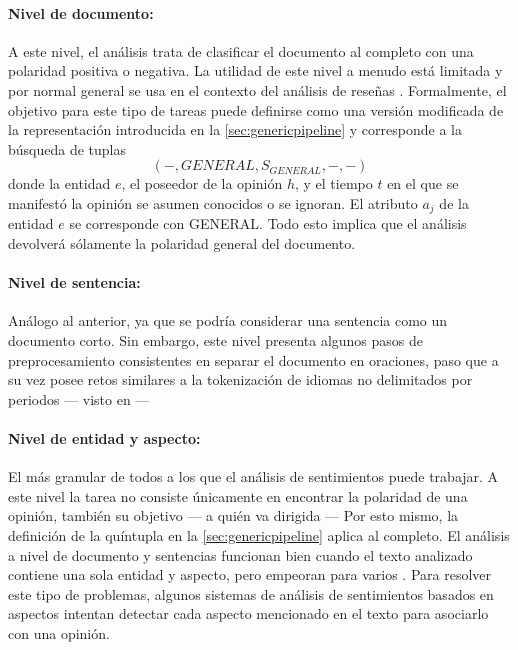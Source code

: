 \paragraph{Nivel de documento:}A este nivel, el análisis trata de clasificar el
documento al completo con una polaridad positiva o negativa. La utilidad de este
nivel a menudo está limitada y por normal general se usa en el contexto del
análisis de reseñas \cite{Liu2012}. Formalmente, el objetivo para este tipo de
tareas puede definirse como una versión modificada de la representación
introducida en la \autoref{sec:genericpipeline} y corresponde a la búsqueda de
tuplas
\[
  (-, GENERAL, S_{GENERAL}, -, -)
\]
donde la entidad $e$, el poseedor de la opinión $h$, y el tiempo $t$ en el que
se manifestó la opinión se asumen conocidos o se ignoran. El atributo $a_j$ de
la entidad $e$ se corresponde con GENERAL. Todo esto implica que el análisis
devolverá sólamente la polaridad general del documento.

\paragraph{Nivel de sentencia:} Análogo al anterior, ya que se podría considerar
una sentencia como un documento corto. Sin embargo, este nivel presenta algunos
pasos de preprocesamiento consistentes en separar el documento en oraciones,
paso que a su vez posee retos similares a la tokenización de idiomas no
delimitados por periodos --- visto en  ---

\paragraph{Nivel de entidad y aspecto:} El más granular de todos a los que el
análisis de sentimientos puede trabajar. A este nivel la tarea no consiste
únicamente en encontrar la polaridad de una opinión, también su objetivo --- a
quién va dirigida --- Por esto mismo, la definición de la quíntupla en la
\autoref{sec:genericpipeline} aplica al completo. El análisis a nivel de
documento y sentencias funcionan bien cuando el texto analizado contiene una
sola entidad y aspecto, pero empeoran para varios \cite{Feldman2013}. Para
resolver este tipo de problemas, algunos sistemas de análisis de sentimientos
basados en aspectos intentan detectar cada aspecto mencionado en el texto para
asociarlo con una opinión.

